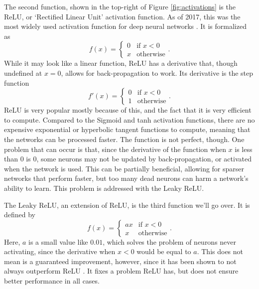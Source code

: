 \documentclass[11pt,a4paper,oldfontcommands]{memoir}
\begin{document}
The second function, shown in the top-right of Figure \ref{fig:activations} is the ReLU, or `Rectified Linear Unit' activation function. As of 2017, this was the most widely used activation function for deep neural networks \cite{searching_for_activation_functions}. It is formalized as
\begin{equation}
    f(x) = 
    \begin{cases} 
        0 & \textrm{if  } x < 0 \\ 
        x & \textrm{otherwise}
    \end{cases}
    .
\end{equation}
While it may look like a linear function, ReLU has a derivative that, though undefined at $x = 0$, allows for back-propagation to work. Its derivative is the step function
\begin{equation}
    f'(x) = 
    \begin{cases} 
        0 & \textrm{if  } x < 0 \\ 
        1 & \textrm{otherwise}
    \end{cases}
    .
\end{equation}
ReLU is very popular mostly because of this, and the fact that it is very efficient to compute. Compared to the Sigmoid and tanh activation functions, there are no expensive exponential or hyperbolic tangent functions to compute, meaning that the networks can be processed faster. The function is not perfect, though. One problem that can occur is that, since the derivative of the function when $x$ is less than 0 is 0, some neurons may not be updated by back-propagation, or activated when the network is used. This can be partially beneficial, allowing for sparser networks that perform faster, but too many dead neurons can harm a network's ability to learn. This problem is addressed with the Leaky ReLU. 

The Leaky ReLU, an extension of ReLU, is the third function we'll go over. It is defined by
\begin{equation}
    f(x) = 
    \begin{cases} 
        ax & \textrm{if  } x < 0 \\ 
        x & \textrm{otherwise}
    \end{cases}
    .
\end{equation}
Here, $a$ is a small value like $0.01$, which solves the problem of neurons never activating, since the derivative when $x < 0$ would be equal to $a$. This does not mean is a guaranteed improvement, however, since it has been shown to not always outperform ReLU \cite{searching_for_activation_functions}. It fixes a problem ReLU has, but does not ensure better performance in all cases.
\end{document}

